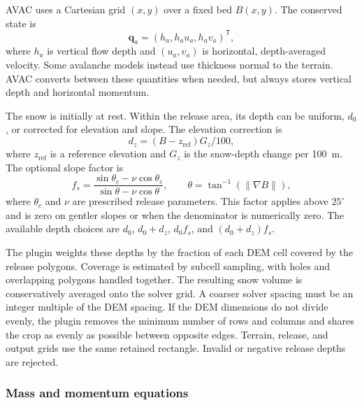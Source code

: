\documentclass[11pt,a4paper]{article}
\begin{document}
AVAC uses a Cartesian grid $(x,y)$ over a fixed bed $B(x,y)$. The conserved
state is
\begin{equation}
  \boldsymbol{q}_a=(h_a,h_a u_a,h_a v_a)^{\mathsf T},
  \label{eq:avac-state}
\end{equation}
where $h_a$ is vertical flow depth and $(u_a,v_a)$ is horizontal,
depth-averaged velocity. Some avalanche models instead use thickness normal
to the terrain. AVAC converts between these quantities when needed, but
always stores vertical depth and horizontal momentum.

The snow is initially at rest. Within the release area, its depth can be
uniform, $d_0$, or corrected for elevation and slope. The elevation correction
is
\begin{equation}
  d_z=(B-z_{\mathrm{ref}})G_z/100,
  \label{eq:release-elevation}
\end{equation}
where $z_{\mathrm{ref}}$ is a reference elevation and $G_z$ is the snow-depth
change per \SI{100}{m}. The optional slope factor is
\begin{equation}
  f_s=\frac{\sin\theta_c-\nu\cos\theta_c}
           {\sin\theta-\nu\cos\theta},
  \qquad \theta=\tan^{-1}\!\left(\lVert\nabla B\rVert\right),
  \label{eq:release-slope}
\end{equation}
where $\theta_c$ and $\nu$ are prescribed release parameters. This factor
applies above $25^\circ$ and is zero on gentler slopes or when the denominator
is numerically zero. The available depth choices are $d_0$, $d_0+d_z$,
$d_0f_s$, and $(d_0+d_z)f_s$.

The plugin weights these depths by the fraction of each DEM cell covered by
the release polygons. Coverage is estimated by subcell sampling, with holes
and overlapping polygons handled together. The resulting snow volume is
conservatively averaged onto the solver grid. A coarser solver spacing must
be an integer multiple of the DEM spacing. If the DEM dimensions do not divide
evenly, the plugin removes the minimum number of rows and columns and shares
the crop as evenly as possible between opposite edges. Terrain, release, and
output grids use the same retained rectangle. Invalid or negative release
depths are rejected.

\subsubsection{Mass and momentum equations}
\end{document}

